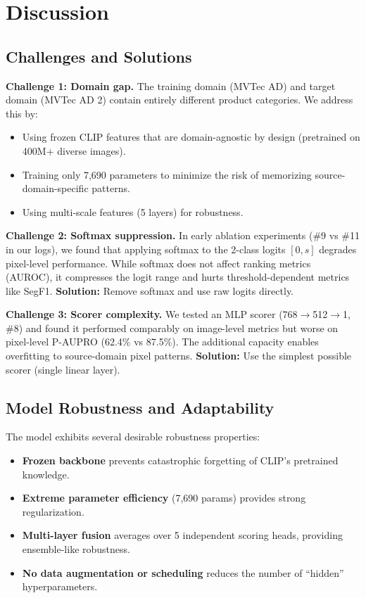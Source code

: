 \documentclass[10pt,twocolumn,letterpaper]{article}
\begin{document}
\section{Discussion}

\subsection{Challenges and Solutions}

\textbf{Challenge 1: Domain gap.} The training domain (MVTec AD) and target domain (MVTec AD 2) contain entirely different product categories. We address this by:
\begin{itemize}[nosep]
  \item Using frozen CLIP features that are domain-agnostic by design (pretrained on 400M+ diverse images).
  \item Training only 7,690 parameters to minimize the risk of memorizing source-domain-specific patterns.
  \item Using multi-scale features (5 layers) for robustness.
\end{itemize}

\textbf{Challenge 2: Softmax suppression.} In early ablation experiments (\#9 vs \#11 in our logs), we found that applying softmax to the 2-class logits $[0, s]$ degrades pixel-level performance. While softmax does not affect ranking metrics (AUROC), it compresses the logit range and hurts threshold-dependent metrics like SegF1. \textbf{Solution:} Remove softmax and use raw logits directly.

\textbf{Challenge 3: Scorer complexity.} We tested an MLP scorer (768$\to$512$\to$1, \#8) and found it performed comparably on image-level metrics but worse on pixel-level P-AUPRO (62.4\% vs 87.5\%). The additional capacity enables overfitting to source-domain pixel patterns. \textbf{Solution:} Use the simplest possible scorer (single linear layer).

\subsection{Model Robustness and Adaptability}

The model exhibits several desirable robustness properties:
\begin{itemize}[nosep]
  \item \textbf{Frozen backbone} prevents catastrophic forgetting of CLIP's pretrained knowledge.
  \item \textbf{Extreme parameter efficiency} (7,690 params) provides strong regularization.
  \item \textbf{Multi-layer fusion} averages over 5 independent scoring heads, providing ensemble-like robustness.
  \item \textbf{No data augmentation or scheduling} reduces the number of ``hidden'' hyperparameters.
\end{itemize}
\end{document}
